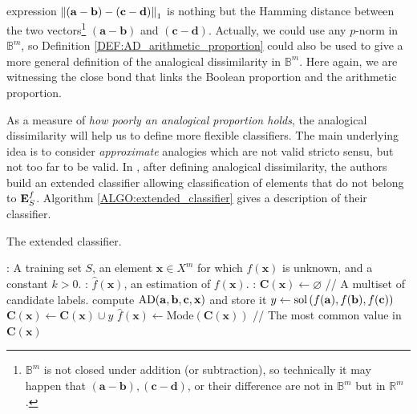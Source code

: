 expression $\norm{1}{(\mathbf{a}-\mathbf{b})-(\mathbf{c}-\mathbf{d})}$ is
nothing but the Hamming distance between the two vectors\footnote{$\mathbb{B}^m$
is not closed under addition (or subtraction), so technically it may happen that
$(\mathbf{a} - \mathbf{b}), (\mathbf{c} - \mathbf{d})$, or their difference are
not in $\mathbb{B}^m$ but in $\mathbb{R}^m$.}
$(\mathbf{a}-\mathbf{b})$ and $(\mathbf{c}-\mathbf{d})$.
Actually, we could use any $p$-norm in $\mathbb{B}^m$, so
Definition \ref{DEF:AD_arithmetic_proportion} could also be used to give a more
general definition of the analogical dissimilarity in $\mathbb{B}^m$. Here
again, we are witnessing the close bond that links the Boolean proportion and
the arithmetic proportion.

As a measure of \textit{how poorly an analogical proportion holds}, the
analogical dissimilarity will help us to define more flexible classifiers.  The
main underlying idea is to consider {\it approximate} analogies which are not
valid stricto sensu, but not too far to be valid.
In \cite{BayMicDelIJCAI07}, after defining analogical dissimilarity,  the authors
build an extended classifier allowing classification of elements that do not
belong to $\esf$. Algorithm \ref{ALGO:extended_classifier} gives a
description of their classifier.

\begin{algorithm}[!ht]
 \caption{The extended classifier.}
       \label{ALGO:extended_classifier}
       \begin{algorithmic}

      : A training set $S$, an element $\mathbf{x} \in X^m$
         for which $f(\mathbf{x})$ is unknown, and a constant $k > 0$.
         : $\hat{f}(\mathbf{x})$, an estimation of
         $f(\mathbf{x})$.
    : $\mathbf{C}(\mathbf{x}) \leftarrow \varnothing$ \quad \quad // A
    multiset of candidate labels.
         \STATE compute $\AD(\mathbf{a}, \mathbf{b}, \mathbf{c}, \mathbf{x})$ and store it
	    \ENDFOR
        \STATE $y \leftarrow \sol\left(f(\mathbf{a}), f(\mathbf{b}), f(\mathbf{c})\right)$
    \STATE $ \mathbf{C}(\mathbf{x}) \leftarrow \mathbf{C}(\mathbf{x}) \cup y$
    \ENDFOR
    \STATE $\hat{f}(\mathbf{x}) \leftarrow \text{Mode} (\mathbf{C}(\mathbf{x}))$ // The
         most common value in $\mathbf{C}(\mathbf{x})$
\end{algorithmic}
\end{algorithm}


